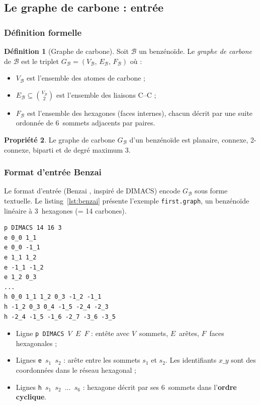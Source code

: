 \documentclass[12pt,a4paper]{article}
\theoremstyle{definition}
\newtheorem{definition}{D\'efinition}[section]
\newtheorem{propriete}[definition]{Propri\'et\'e}
\theoremstyle{remark}
\newcommand{\B}{\mathcal{B}}
\newcommand{\GB}{G_{\!\B}}
\begin{document}
\subsection{Le graphe de carbone : entr\'ee}
\label{sec:graphe-carbone}

\subsubsection{D\'efinition formelle}

\begin{definition}[Graphe de carbone]
Soit $\B$ un benz\'eno\"ide. Le \emph{graphe de carbone} de $\B$ est le
triplet $\GB = (V_\B,\, E_\B,\, F_\B)$ o\`u :
\begin{itemize}
  \item $V_\B$ est l'ensemble des atomes de carbone ;
  \item $E_\B \subseteq \binom{V_\B}{2}$ est l'ensemble des liaisons C--C ;
  \item $F_\B$ est l'ensemble des hexagones (faces internes), chacun
        d\'ecrit par une suite ordonn\'ee de 6~sommets adjacents par paires.
\end{itemize}
\end{definition}

\begin{propriete}
Le graphe de carbone $\GB$ d'un benz\'eno\"ide est planaire, connexe,
2-connexe, biparti et de degr\'e maximum 3.
\end{propriete}

\subsubsection{Format d'entr\'ee Benzai}

Le format d'entr\'ee (\og Benzai \fg{}, inspir\'e de DIMACS) encode
$\GB$ sous forme textuelle. Le listing~\ref{lst:benzai} pr\'esente
l'exemple \texttt{first.graph}, un benz\'eno\"ide lin\'eaire \`a
3~hexagones (= 14 carbones).

\begin{lstlisting}[style=benzai,
  caption={Fichier Benzai d'un benz\'eno\"ide \`a 3 hexagones lin\'eaires.},
  label={lst:benzai}]
p DIMACS 14 16 3
e 0_0 1_1
e 0_0 -1_1
e 1_1 1_2
e -1_1 -1_2
e 1_2 0_3
...
h 0_0 1_1 1_2 0_3 -1_2 -1_1
h -1_2 0_3 0_4 -1_5 -2_4 -2_3
h -2_4 -1_5 -1_6 -2_7 -3_6 -3_5
\end{lstlisting}

\begin{itemize}
  \item Ligne \texttt{p DIMACS $V$ $E$ $F$} : ent\^ete avec
        $V$~sommets, $E$~ar\^etes, $F$~faces hexagonales ;
  \item Lignes \texttt{e $s_1$ $s_2$} : ar\^ete entre les sommets
        $s_1$ et $s_2$. Les identifiants $x\_y$ sont des coordonn\'ees
        dans le r\'eseau hexagonal ;
  \item Lignes \texttt{h $s_1$ $s_2$ $\ldots$ $s_6$} : hexagone d\'ecrit
        par ses 6~sommets dans l'\textbf{ordre cyclique}.
\end{itemize}
\end{document}
